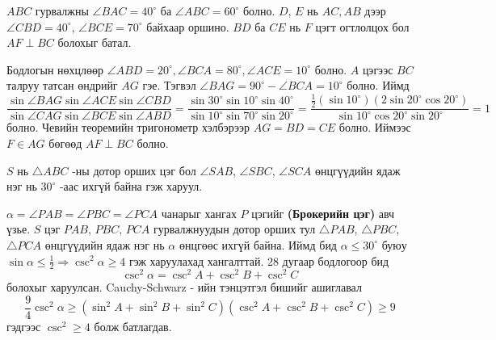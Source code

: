 \documentclass[10pt,a4paper,oneside]{book}
\begin{document}
\Problem
[Canada 1998] $ABC$ гурвалжны $\angle BAC=40^\circ$ ба $\angle ABC = 60^\circ$ болно. $D$, $E$ нь $AC, AB$ дээр  $\angle CBD=40^\circ$, $\angle BCE=70^\circ$ байхаар оршино. $BD$ ба $CE$ нь $F$ цэгт огтлолцох бол $AF\perp BC$ болохыг батал.

\TheSolution
Бодлогын нөхцлөөр $\angle ABD = 20^\circ, \angle BCA = 80^\circ, \angle ACE = 10^\circ$ болно. $A$ цэгээс $BC$ талруу татсан өндрийг $AG$ гэе. Тэгвэл $\angle BAG = 90^\circ - \angle BCA = 10^\circ$ болно. Иймд
\begin{equation*}
\frac{\sin \angle BAG \sin \angle ACE \sin \angle CBD}{\sin \angle CAG \sin \angle BCE \sin \angle ABD} = 
\frac{\sin 30^\circ \sin 10^\circ \sin 40^\circ}{\sin 10^\circ \sin 70^\circ \sin 20^\circ}
= \frac{\frac{1}{2}(\sin 10^\circ)(2\sin 20^\circ \cos 20^\circ)}{\sin 10^\circ \cos 20^\circ \sin 20^\circ} = 1
\end{equation*}
болно. Чевийн теоремийн тригонометр хэлбэрээр $AG=BD=CE$ болно. Иймээс $F \in AG$ бөгөөд $AF \perp BC$ болно.


\Problem
[IMO 1991] $S$ нь $\triangle ABC$ -ны дотор орших цэг бол $\angle SAB$, $\angle SBC$, $\angle SCA$ өнцгүүдийн ядаж нэг нь $30^\circ$ -аас ихгүй байна гэж харуул.

\ASolution
$\alpha =\angle PAB = \angle PBC = \angle PCA$ чанарыг хангах $P$ цэгийг \textbf{(Брокерийн цэг)} авч үзье. $S$ цэг $PAB$, $PBC$, $PCA$ гурвалжнуудын дотор орших тул $\triangle PAB$, $\triangle PBC$, $\triangle PCA$ өнцгүүдийн ядаж нэг нь $\alpha$ өнцгөөс ихгүй байна. Иймд бид $\alpha \leq 30^\circ$ буюу $\sin \alpha \leq \frac{1}{2} \Rightarrow \csc^2 \alpha \geq 4$ гэж харуулахад хангалттай. 28 дугаар бодлогоор бид
\begin{equation*}
\csc^2 \alpha = \csc^2 A + \csc^2 B + \csc^2 C
\end{equation*}
болохыг харуулсан. Cauchy-Schwarz - ийн тэнцэтгэл бишийг ашиглавал
\begin{equation*}
\frac{9}{4}\csc^2 \alpha \geq (\sin^2 A + \sin^2 B + \sin^2 C)(\csc^2 A + \csc^2 B + \csc^2 C)\geq 9
\end{equation*}
гэдгээс $\csc^2 \geq 4$ болж батлагдав.
\end{document}
